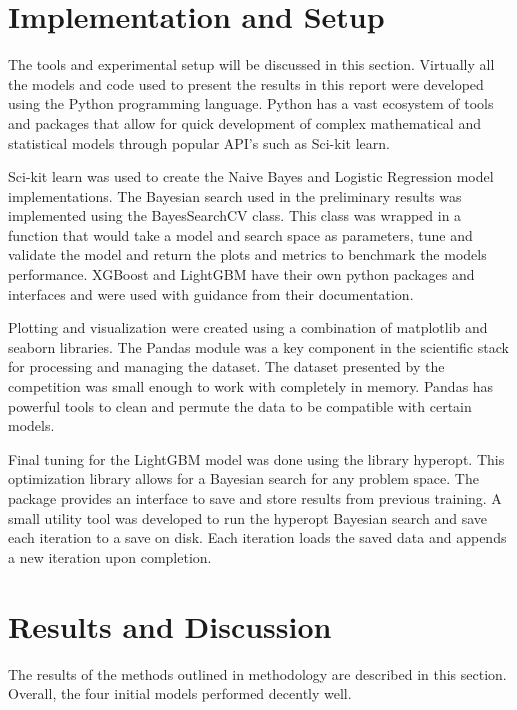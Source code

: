 \documentclass[journal,twoside,web]{ieeecolor}
\begin{document}
                     


\section{Implementation and Setup}
The tools and experimental setup will be discussed in this section. Virtually all the models and code used to present the results in this report were developed using the Python programming language. Python has a vast ecosystem of tools and packages that allow for quick development of complex mathematical and statistical models through popular API's such as Sci-kit learn. 

Sci-kit learn was used to create the Naive Bayes and Logistic Regression model implementations. The Bayesian search used in the preliminary results was implemented using the BayesSearchCV class. This class was wrapped in a function that would take a model and search space as parameters, tune and validate the model and return the plots and metrics to benchmark the models performance. XGBoost and LightGBM have their own python packages and interfaces and were used with guidance from their documentation. 

Plotting and visualization were created using a combination of matplotlib and seaborn libraries. The Pandas module was a key component in the scientific stack for processing and managing the dataset. The dataset presented by the competition was small enough to work with completely in memory. Pandas has powerful tools to clean and permute the data to be compatible with certain models.

Final tuning for the LightGBM model was done using the library hyperopt. This optimization library allows for a Bayesian search for any problem space. The package provides an interface to save and store results from previous training. A small utility tool was developed to run the hyperopt Bayesian search and save each iteration to a save on disk. Each iteration loads the saved data and appends a new iteration upon completion.


\section{Results and Discussion}
The results of the methods outlined in methodology are described in this section. Overall, the four initial models performed decently well. 
\end{document}
